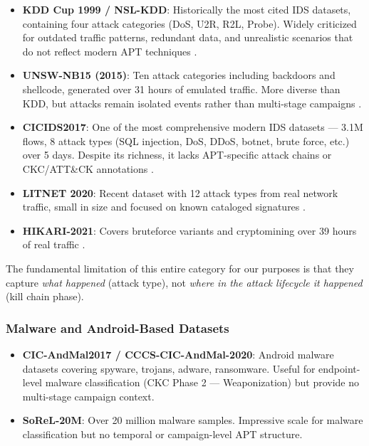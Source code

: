 \begin{itemize}
\item \textbf{KDD Cup 1999 / NSL-KDD}: Historically the most cited IDS datasets, containing four attack categories (DoS, U2R, R2L, Probe). Widely criticized for outdated traffic patterns, redundant data, and unrealistic scenarios that do not reflect modern APT techniques \cite{ankalaki2025cyber}.
\item \textbf{UNSW-NB15 (2015)}: Ten attack categories including backdoors and shellcode, generated over 31 hours of emulated traffic. More diverse than KDD, but attacks remain isolated events rather than multi-stage campaigns \cite{ankalaki2025cyber}.
\item \textbf{CICIDS2017}: One of the most comprehensive modern IDS datasets — 3.1M flows, 8 attack types (SQL injection, DoS, DDoS, botnet, brute force, etc.) over 5 days. Despite its richness, it lacks APT-specific attack chains or CKC/ATT\&CK annotations \cite{ankalaki2025cyber}.
\item \textbf{LITNET 2020}: Recent dataset with 12 attack types from real network traffic, small in size and focused on known cataloged signatures \cite{ankalaki2025cyber}.
\item \textbf{HIKARI-2021}: Covers bruteforce variants and cryptomining over 39 hours of real traffic \cite{ankalaki2025cyber}.
\end{itemize}

The fundamental limitation of this entire category for our purposes is that they capture \textit{what happened} (attack type), not \textit{where in the attack lifecycle it happened} (kill chain phase).

\subsubsection{Malware and Android-Based Datasets}

\begin{itemize}
\item \textbf{CIC-AndMal2017 / CCCS-CIC-AndMal-2020}: Android malware datasets covering spyware, trojans, adware, ransomware. Useful for endpoint-level malware classification (CKC Phase 2 — Weaponization) but provide no multi-stage campaign context.
\item \textbf{SoReL-20M}: Over 20 million malware samples. Impressive scale for malware classification but no temporal or campaign-level APT structure.
\end{itemize}

